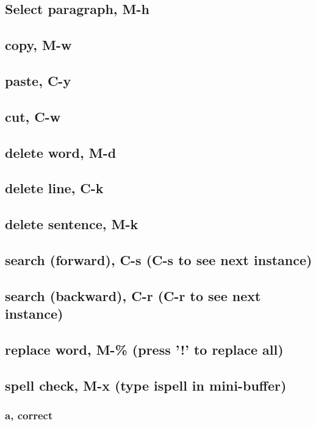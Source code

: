 \documentclass[11pt]{article}
\begin{document}
\subsection{Select paragraph, M-h}
\label{sec:orge715041}
\subsection{copy, M-w}
\label{sec:org1f77834}
\subsection{paste, C-y}
\label{sec:org332f976}
\subsection{cut, C-w}
\label{sec:org1eac603}
\subsection{delete word, M-d}
\label{sec:org92b3b83}
\subsection{delete line, C-k}
\label{sec:orgae9a4ec}
\subsection{delete sentence, M-k}
\label{sec:orgd891b47}
\subsection{search (forward), C-s (C-s to see next instance)}
\label{sec:orgb735ac7}
\subsection{search (backward), C-r (C-r to see next instance)}
\label{sec:org4eff8c2}
\subsection{replace word, M-\% (press '!' to replace all)}
\label{sec:org7d11a20}
\subsection{spell check, M-x (type ispell in mini-buffer)}
\label{sec:orga92987f}
\subsubsection{a, correct}
\label{sec:org2580e6a}
\end{document}
